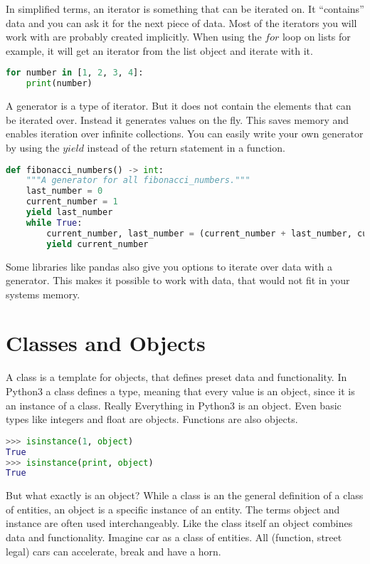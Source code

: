 \documentclass{article}
\newcommand{\qq}[1]{``#1''}
\begin{document}
In simplified terms, an iterator is something that can be iterated on.
It \qq{contains} data and you can ask it for the next piece of data.
Most of the iterators you will work with are probably created implicitly.
When using the $for$ loop on lists for example, it will get an iterator from the
list object and iterate with it.

\begin{lstlisting}[language=Python]
for number in [1, 2, 3, 4]:
    print(number)
\end{lstlisting}

A generator is a type of iterator.
But it does not contain the elements that can be iterated over.
Instead it generates values on the fly.
This saves memory and enables iteration over infinite collections.
You can easily write your own generator by using the $yield$ instead of the
return statement in a function.

\begin{lstlisting}[language=Python]
def fibonacci_numbers() -> int:
    """A generator for all fibonacci_numbers."""
    last_number = 0
    current_number = 1
    yield last_number
    while True:
        current_number, last_number = (current_number + last_number, current_number)
        yield current_number
\end{lstlisting}

Some libraries like pandas also give you options to iterate over data with a
generator.
This makes it possible to work with data, that would not fit in your
systems memory.

\section{Classes and Objects}

A class is a template for objects, that defines preset data and functionality.
In Python3 a class defines a type, meaning that every value is an object,
since it is an instance of a class.
Really Everything in Python3 is an object.
Even basic types like integers and float are objects.
Functions are also objects.

\begin{lstlisting}[language=python]
>>> isinstance(1, object)
True
>>> isinstance(print, object)
True
\end{lstlisting}

But what exactly is an object?
While a class is an the general definition of a class of entities, an object
is a specific instance of an entity.
The terms object and instance are often used interchangeably.
Like the class itself an object combines data and functionality.
Imagine car as a class of entities.
All (function, street legal) cars can accelerate, break and have a horn.
\end{document}
